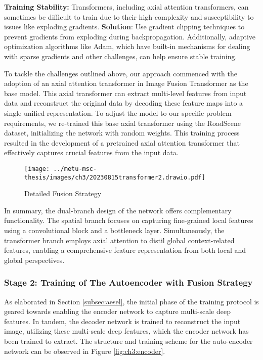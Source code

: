\begin{list}{}{}
    \item \textbf{Training Stability:}
    Transformers, including axial attention transformers, can sometimes be difficult to train due to their high complexity and susceptibility to issues like exploding gradients. \textbf{Solution}: Use gradient clipping techniques to prevent gradients from exploding during backpropagation. Additionally, adaptive optimization algorithms like Adam, which have built-in mechanisms for dealing with sparse gradients and other challenges, can help ensure stable training.
\end{list}

To tackle the challenges outlined above, our approach commenced with the adoption of an axial attention transformer in Image Fusion Transformer \cite{vs2022image} as the base model. This axial transformer can extract multi-level features from input data and reconstruct the original data by decoding these feature maps into a single unified representation. To adjust the model to our specific problem requirements, we re-trained this base axial transformer using the RoadScene \cite{xu2020aaai} dataset, initializing the network with random weights. This training process resulted in the development of a pretrained axial attention transformer that effectively captures crucial features from the input data.

\begin{figure}[htbp]
    \centering
    \texttt{[image: ../metu-msc-thesis/images/ch3/20230815transformer2.drawio.pdf]}
    \caption{Detailed Fusion Strategy}
    \label{fig:ch3:fusionM}
\end{figure}

In summary, the dual-branch design of the network offers complementary functionality. The spatial branch focuses on capturing fine-grained local features using a convolutional block and a bottleneck layer. Simultaneously, the transformer branch employs axial attention to distil global context-related features, enabling a comprehensive feature representation from both local and global perspectives.

\subsubsection{Stage 2: Training of The Autoencoder with Fusion Strategy} \label{subsec:fusionloss}

As elaborated in Section \ref{subsec:aesel}, the initial phase of the training protocol is geared towards enabling the encoder network to capture multi-scale deep features. In tandem, the decoder network is trained to reconstruct the input image, utilizing these multi-scale deep features, which the encoder network has been trained to extract. The structure and training scheme for the auto-encoder network can be observed in Figure \ref{fig:ch3:encoder}.

